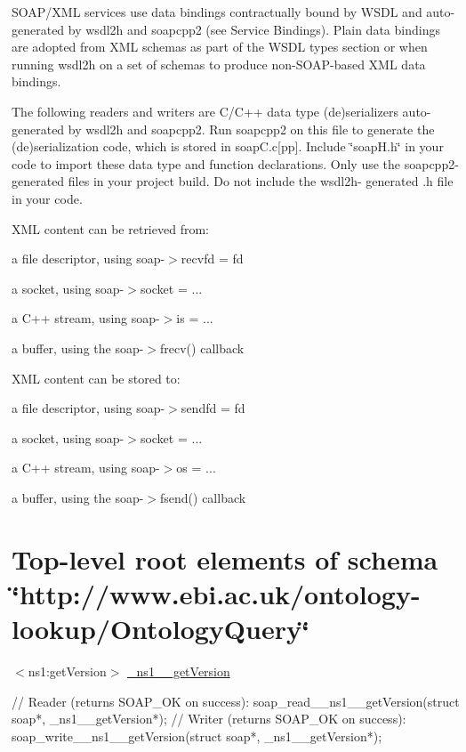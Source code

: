 SOAP/XML services use data bindings contractually bound by WSDL and auto-\/ generated by wsdl2h and soapcpp2 (see Service Bindings). Plain data bindings are adopted from XML schemas as part of the WSDL types section or when running wsdl2h on a set of schemas to produce non-\/SOAP-\/based XML data bindings.

The following readers and writers are C/C++ data type (de)serializers auto-\/ generated by wsdl2h and soapcpp2. Run soapcpp2 on this file to generate the (de)serialization code, which is stored in soapC.c\mbox{[}pp\mbox{]}. Include \char`\"{}soapH.h\char`\"{} in your code to import these data type and function declarations. Only use the soapcpp2-\/generated files in your project build. Do not include the wsdl2h-\/ generated .h file in your code.

XML content can be retrieved from:
\begin{DoxyItemize}
\item a file descriptor, using soap-\/$>$recvfd = fd
\item a socket, using soap-\/$>$socket = ...
\item a C++ stream, using soap-\/$>$is = ...
\item a buffer, using the soap-\/$>$frecv() callback
\end{DoxyItemize}

XML content can be stored to:
\begin{DoxyItemize}
\item a file descriptor, using soap-\/$>$sendfd = fd
\item a socket, using soap-\/$>$socket = ...
\item a C++ stream, using soap-\/$>$os = ...
\item a buffer, using the soap-\/$>$fsend() callback
\end{DoxyItemize}\hypertarget{page_XMLDataBinding_ns1}{}\section{Top-\/level root elements of schema \char`\"{}http://www.ebi.ac.uk/ontology-\/lookup/OntologyQuery\char`\"{}}\label{page_XMLDataBinding_ns1}

\begin{DoxyItemize}
\item $<$ns1:getVersion$>$ \hyperlink{class__ns1____getVersion}{\_\-ns1\_\-\_\-getVersion} 
\begin{DoxyCode}
    // Reader (returns SOAP_OK on success):
    soap_read__ns1__getVersion(struct soap*, _ns1__getVersion*);
    // Writer (returns SOAP_OK on success):
    soap_write__ns1__getVersion(struct soap*, _ns1__getVersion*);
\end{DoxyCode}

\end{DoxyItemize}


